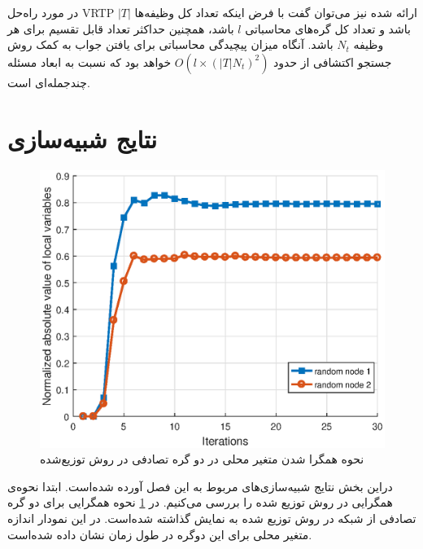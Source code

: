 	در مورد راه‌حل VRTP ارائه شده نیز می‌توان گفت با فرض اینکه تعداد کل وظیفه‌ها $|T|$ باشد و تعداد کل گره‌های محاسباتی $l$ باشد، همچنین حداکثر تعداد قابل تقسیم برای هر وظیفه $N_t$ باشد. آنگاه میزان پیچیدگی محاسباتی برای یافتن جواب به کمک روش جستجو اکتشافی از حدود $O(l\times(|T|N_t)^2)$ خواهد بود که نسبت به ابعاد مسئله چندجمله‌ای است. 
	
\section{نتایج شبیه‌سازی}

\begin{figure}[h!]
	\centerline{\includegraphics[width=12cm]{graphics/4-heuristic-dist/distributed_local_vars_convergence}}
	\caption{نحوه‌ همگرا شدن متغیر محلی در دو گره تصادفی در روش توزیع‌شده}
	\label{fig:distributed_local_vars_convergence}
\end{figure}

	دراین بخش نتایج شبیه‌سازی‌های مربوط به این فصل آورده شده‌است. ابتدا نحوه‌ی همگرایی در روش توزیع شده را بررسی می‌کنیم. در \cref{fig:distributed_local_vars_convergence} نحوه همگرایی برای دو گره تصادفی از شبکه در روش توزیع شده به نمایش گذاشته شده‌است. در این نمودار اندازه متغیر محلی برای این دوگره در طول زمان نشان داده شده‌است. 
	
